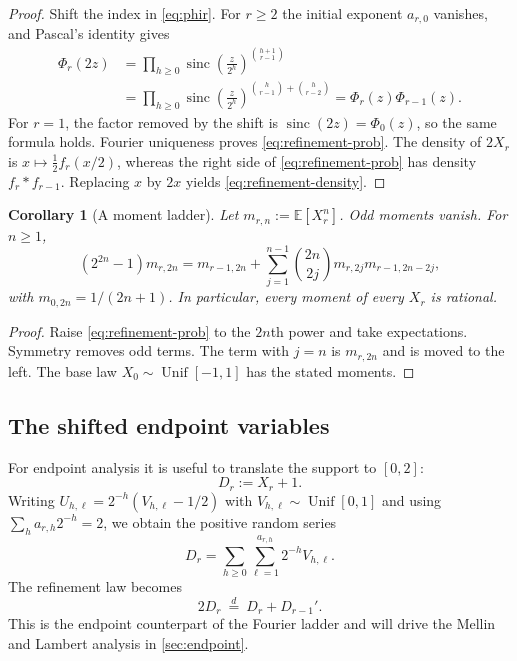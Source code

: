 \documentclass[11pt,a4paper]{article}
\theoremstyle{frontier}
\newtheorem{corollary}[theorem]{Corollary}
\theoremstyle{definition}
\newcommand{\sinc}{\operatorname{sinc}}
\newcommand{\E}{\mathbb E}
\begin{document}
\begin{proof}
Shift the index in \eqref{eq:phir}.  For $r\ge2$ the initial exponent $a_{r,0}$ vanishes, and Pascal's identity gives
\begin{align*}
 \Phi_r(2z)
 &=\prod_{h\ge0}\sinc\!\left(\frac z{2^h}\right)^{\binom{h+1}{r-1}}\\
 &=\prod_{h\ge0}\sinc\!\left(\frac z{2^h}\right)^{\binom h{r-1}+\binom h{r-2}}
 =\Phi_r(z)\Phi_{r-1}(z).
\end{align*}
For $r=1$, the factor removed by the shift is $\sinc(2z)=\Phi_0(z)$, so the same formula holds.  Fourier uniqueness proves \eqref{eq:refinement-prob}.  The density of $2X_r$ is $x\mapsto \frac12 f_r(x/2)$, whereas the right side of \eqref{eq:refinement-prob} has density $f_r*f_{r-1}$.  Replacing $x$ by $2x$ yields \eqref{eq:refinement-density}.
\end{proof}

\begin{corollary}[A moment ladder]\label{cor:moment-ladder}
Let $m_{r,n}:=\E[X_r^n]$.  Odd moments vanish.  For $n\ge1$,
\begin{equation}\label{eq:moment-ladder}
 (2^{2n}-1)m_{r,2n}
 =m_{r-1,2n}
 +\sum_{j=1}^{n-1}\binom{2n}{2j}m_{r,2j}m_{r-1,2n-2j},
\end{equation}
with $m_{0,2n}=1/(2n+1)$.  In particular, every moment of every $X_r$ is rational.
\end{corollary}

\begin{proof}
Raise \eqref{eq:refinement-prob} to the $2n$th power and take expectations.  Symmetry removes odd terms.  The term with $j=n$ is $m_{r,2n}$ and is moved to the left.  The base law $X_0\sim\operatorname{Unif}[-1,1]$ has the stated moments.
\end{proof}

\subsection{The shifted endpoint variables}

For endpoint analysis it is useful to translate the support to $[0,2]$:
\begin{equation}\label{eq:Dr}
  D_r:=X_r+1.
\end{equation}
Writing $U_{h,\ell}=2^{-h}(V_{h,\ell}-1/2)$ with $V_{h,\ell}\sim\operatorname{Unif}[0,1]$ and using $\sum_h a_{r,h}2^{-h}=2$, we obtain the positive random series
\begin{equation}\label{eq:Dr-series}
  D_r=\sum_{h\ge0}\sum_{\ell=1}^{a_{r,h}}2^{-h}V_{h,\ell}.
\end{equation}
The refinement law becomes
\begin{equation}\label{eq:Dr-refine}
  2D_r\ \stackrel d=\ D_r+D_{r-1}'.
\end{equation}
This is the endpoint counterpart of the Fourier ladder and will drive the Mellin and Lambert analysis in \cref{sec:endpoint}.
\end{document}
